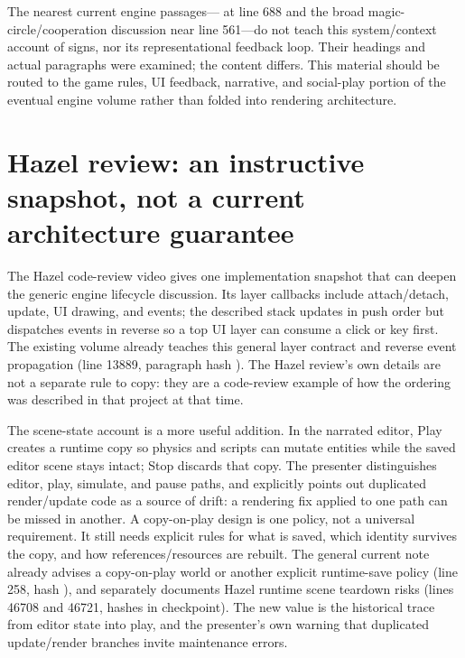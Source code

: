 The nearest current engine passages--- at line 688 and the broad magic-circle/cooperation discussion near line 561---do not teach this system/context account of signs, nor its representational feedback loop. Their headings and actual paragraphs were examined; the content differs. This material should be routed to the game rules, UI feedback, narrative, and social-play portion of the eventual engine volume rather than folded into rendering architecture.

\section{Hazel review: an instructive snapshot, not a current architecture guarantee}\label{06-engine-ii-ch046-hazel-review-an-instructive-snapshot-not-a-current-architecture-guarantee}

\hypertarget{06-engine-ii-ch046-hazel-review-an-instructive-snapshot-not-a-current-architecture-guarantee}{}

The Hazel code-review video gives one implementation snapshot that can deepen the generic engine lifecycle discussion. Its layer callbacks include attach/detach, update, UI drawing, and events; the described stack updates in push order but dispatches events in reverse so a top UI layer can consume a click or key first. The existing volume already teaches this general layer contract and reverse event propagation (line 13889, paragraph hash ). The Hazel review's own details are not a separate rule to copy: they are a code-review example of how the ordering was described in that project at that time.

The scene-state account is a more useful addition. In the narrated editor, Play creates a runtime copy so physics and scripts can mutate entities while the saved editor scene stays intact; Stop discards that copy. The presenter distinguishes editor, play, simulate, and pause paths, and explicitly points out duplicated render/update code as a source of drift: a rendering fix applied to one path can be missed in another. A copy-on-play design is one policy, not a universal requirement. It still needs explicit rules for what is saved, which identity survives the copy, and how references/resources are rebuilt. The general current note already advises a copy-on-play world or another explicit runtime-save policy (line 258, hash ), and separately documents Hazel runtime scene teardown risks (lines 46708 and 46721, hashes in checkpoint). The new value is the historical trace from editor state into play, and the presenter's own warning that duplicated update/render branches invite maintenance errors.

